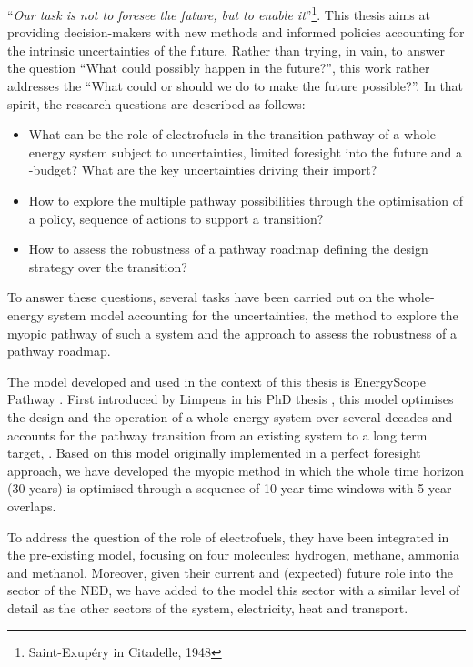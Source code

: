 \noindent
``\textit{Our task is not to foresee the future, but to enable it}''\footnote{Saint-Exupéry in Citadelle, 1948}. This thesis aims at providing decision-makers with new methods and informed policies accounting for the intrinsic uncertainties of the future.  Rather than trying, in vain, to answer the question ``What could possibly happen in the future?'', this work rather addresses the ``What could or should we do to make the future possible?''. In that spirit, the research questions are described as follows:
\begin{itemize}
\item What can be the role of electrofuels in the transition pathway of a whole-energy system subject to uncertainties, limited foresight into the future and a -budget? What are the key uncertainties driving their import?
\item How to explore the multiple pathway possibilities through the optimisation of a policy, \ie sequence of actions to support a transition?
\item How to assess the robustness of a pathway roadmap defining the design strategy over the transition?
\end{itemize}

To answer these questions, several tasks have been carried out on the whole-energy system model accounting for the uncertainties, the method to explore the myopic pathway of such a system and the approach to assess the robustness of a pathway roadmap. 

The model developed and used in the context of this thesis is EnergyScope Pathway \cite{limpens2024pathway}. First introduced by Limpens in his PhD thesis \cite{limpens2021generating}, this model optimises the design and the operation of a whole-energy system over several decades and accounts for the pathway transition from an existing system to a long term target, . Based on this model originally implemented in a perfect foresight approach, we have developed the myopic method in which the whole time horizon (30 years) is optimised through a sequence of 10-year time-windows with 5-year overlaps.

To address the question of the role of electrofuels, they have been integrated in the pre-existing model, focusing on four molecules: hydrogen, methane, ammonia and methanol. Moreover, given their current and (expected) future role into the sector of the \gls{NED}, we have added to the model this sector with a similar level of detail as the other sectors of the system, \ie electricity, heat and transport. 

